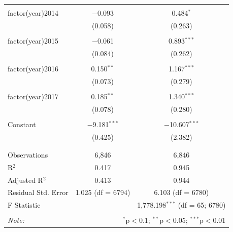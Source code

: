 \begin{table}[!htbp]
\begin{tabular}{@{\extracolsep{5pt}}lcc}
  & & \\ 
 factor(year)2014 & $-$0.093 & 0.484$^{*}$ \\ 
  & (0.058) & (0.263) \\ 
  & & \\ 
 factor(year)2015 & $-$0.061 & 0.893$^{***}$ \\ 
  & (0.084) & (0.262) \\ 
  & & \\ 
 factor(year)2016 & 0.150$^{**}$ & 1.167$^{***}$ \\ 
  & (0.073) & (0.279) \\ 
  & & \\ 
 factor(year)2017 & 0.185$^{**}$ & 1.340$^{***}$ \\ 
  & (0.078) & (0.280) \\ 
  & & \\ 
 Constant & $-$9.181$^{***}$ & $-$10.607$^{***}$ \\ 
  & (0.425) & (2.382) \\ 
  & & \\ 
\hline \\[-1.8ex] 
Observations & 6,846 & 6,846 \\ 
R$^{2}$ & 0.417 & 0.945 \\ 
Adjusted R$^{2}$ & 0.413 & 0.944 \\ 
Residual Std. Error & 1.025 (df = 6794) & 6.103 (df = 6780) \\ 
F Statistic &  & 1,778.198$^{***}$ (df = 65; 6780) \\ 
\hline 
\hline \\[-1.8ex] 
\textit{Note:}  & \multicolumn{2}{r}{$^{*}$p$<$0.1; $^{**}$p$<$0.05; $^{***}$p$<$0.01} \\ 
\end{tabular} 
\end{table} 
